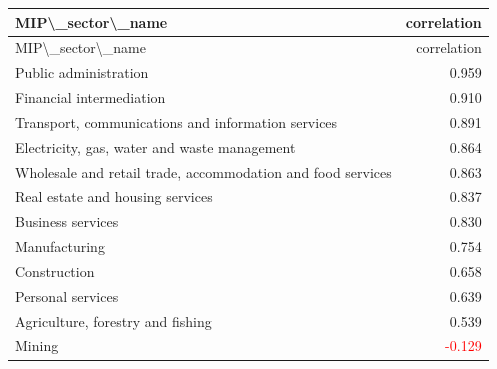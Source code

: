 \begin{longtable}{lr}
\hline
MIP\textbackslash{}_sector\textbackslash{}_name & correlation \\ 
\hline\endfirsthead
\hline
MIP\textbackslash{}_sector\textbackslash{}_name & correlation \\ 
\hline\endhead
Public administration & 0.959 \\ 
Financial intermediation & 0.910 \\ 
Transport, communications and information services & 0.891 \\ 
Electricity, gas, water and waste management & 0.864 \\ 
Wholesale and retail trade, accommodation and food services & 0.863 \\ 
Real estate and housing services & 0.837 \\ 
Business services & 0.830 \\ 
Manufacturing & 0.754 \\ 
Construction & 0.658 \\ 
Personal services & 0.639 \\ 
Agriculture, forestry and fishing & 0.539 \\ 
Mining & \textcolor{red}{-0.129} \\ 
\hline
\end{longtable}
